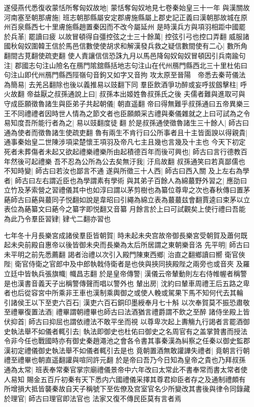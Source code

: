 遂侵燕代悉復收蒙恬所奪匈奴故地|{
	蒙恬奪匈奴地見七卷秦始皇三十一年}
與漢關故河南塞至朝那膚施|{
	班志朝那縣屬安定郡膚施縣屬上郡史記正義曰漢朝那故城在原州百泉縣西七十里膚施縣趙置秦因而不改今屬延州}
是時漢兵方與項羽相距中國罷於兵革|{
	罷讀曰疲}
以故冒頓得自彊控弦之士三十餘萬|{
	控弦引弓也控口弄翻}
威服諸國秋匈奴圍韓王信於馬邑信數使使胡求和解漢發兵救之疑信數間使有二心|{
	數所角翻間古莧翻使疏吏翻}
使人責讓信信恐誅九月以馬邑降匈奴匈奴冒頓因引兵南踰句注|{
	郡國志句注山險名在鴈門隂舘縣括地志句注山在代州鴈門縣西北三十里杜佑曰句注山即代州鴈門縣西陘嶺句音鉤又如字又音拘}
攻太原至晉陽　帝悉去秦苛儀法為簡易|{
	去羌呂翻除也後以義推易以豉翻下同}
羣臣飲酒爭功醉或妄呼拔劔擊柱|{
	呼火故翻}
帝益厭之叔孫通說上曰|{
	叔孫本出姬姓魯叔孫氏之後}
夫儒者難與進取可與守成臣願徵魯諸生與臣弟子共起朝儀|{
	朝直遥翻}
帝曰得無難乎叔孫通曰五帝異樂三王不同禮禮者因時世人情為之節文者也臣願頗采古禮與秦儀雜就之上曰可試為之令易知度吾所能行者為之|{
	易以豉翻度徒翻}
於是叔孫通使徵魯諸生三十餘人|{
	師古曰通為使者而徵魯諸生使疏吏翻}
魯有兩生不肯行曰公所事者且十主皆面諛以得親貴|{
	通事秦始皇二世陳涉項梁楚懷王項羽及帝凡七主且幾也言幾及十主也}
今天下初定死者未葬傷者未起又欲起禮樂禮樂所由起積德百年而後可興也|{
	師古曰言行德教百年然後可起禮樂}
吾不忍為公所為公去矣無汙我|{
	汙烏故翻}
叔孫通笑曰若真鄙儒也不知時變|{
	師古曰若汝也鄙言不通}
遂與所徵三十人西|{
	師古曰西入關}
及上左右為學者|{
	師古曰左右謂近臣也為學謂素有學術}
與其弟子百餘人為綿蕞野外習之|{
	應劭曰立竹及茅索營之習禮儀其中也如淳曰謂以茅剪樹也為纂位尊卑之次也春秋傳曰置茅蕝師古曰蕝與蕞同子悦翻如說是韋昭曰引繩為綿立表為蕞蕞兹會翻賈逵曰束茅以立表位為蕝纂文曰蕝今之纂字即悦翻又音纂}
月餘言於上曰可試觀矣上使行禮曰吾能為此乃令羣臣習肄|{
	肄弋二翻亦習也}


七年冬十月長樂宮成諸侯羣臣皆朝賀|{
	時未起未央宫故帝御長樂宮受朝賀及蕭何既起未央前殿自惠帝以後皆御未央而長樂為太后所居謂之東朝樂音洛}
先平明|{
	師古曰未平明之前先悉薦翻}
謁者治禮以次引入殿門陳東西鄉|{
	治直之翻鄉讀曰嚮}
衛官俠陛|{
	衛官侍衛之官郎中及中郎執戟侍衛者是也俠與挾同挾殿陛之兩旁也或音夾}
及羅立廷中皆執兵張旗幟|{
	幟昌志翻}
於是皇帝傳警|{
	漢儀云帝輦動則左右侍帷幄者稱警是也漢書音義天子出稱警傳聲而唱以警外也}
輦出房|{
	沈約曰輦車周禮王后五路之卑者也后從容宮中所乘非王車也漢制乘輿御之或使人輓或駕果下馬不知何代去其輪}
引諸侯王以下至吏六百石|{
	漢吏六百石銅印墨綬奉月七十斛}
以次奉賀莫不振恐肅敬至禮畢復置法酒|{
	禮畢謂朝禮畢也師古曰法酒猶言禮爵謂不飲之至醉}
諸侍坐殿上皆伏抑首|{
	師古曰抑屈也謂依禮法不敢平坐而視}
以尊卑次起上夀觴九行謁者言罷酒御史執法舉不如儀者輒引去|{
	執法即御史也杜佑曰御史之名周官有之盖掌贊書而授法令非今任也戰國時亦有御史秦趙澠池之會各令書其事秦漢為糾察之任秦以御史監郡漢初定禮儀御史執法舉不如儀者輒引去是也}
竟朝置酒無敢讙譁失禮者|{
	竟朝言行朝禮至禮畢也朝直遥翻讙與喧同許元翻}
於是帝曰吾乃今日知為皇帝之貴也乃拜叔孫通為太常|{
	班表奉常秦官掌宗廟禮儀景帝中六年改曰太常此不書奉常而書太常者使人易知}
賜金五百斤初秦有天下悉内六國禮儀采擇其尊君抑臣者存之及通制禮頗有所增損大抵皆襲秦故自天子稱號下至佐僚及宫室官名少所變改其書後與律令同錄藏於理官|{
	師古曰理官即法官也}
法家又復不傳民臣莫有言者焉

